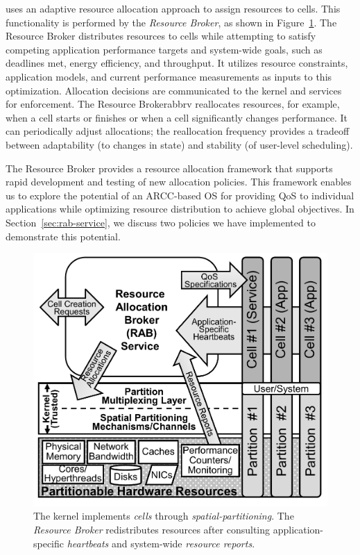 \tess uses an adaptive resource allocation approach to assign resources
to cells.  This functionality is performed by the \emph{Resource Broker}, as
shown in Figure~\ref{fig:tess-arch}.  The Resource Broker distributes
resources to cells while attempting to satisfy competing application
performance targets and system-wide goals, such as deadlines met, energy
efficiency, and throughput.  It utilizes resource constraints,
application models, and current performance measurements as inputs to
this optimization.  Allocation decisions are communicated to the kernel
and services for enforcement.  The Resource Brokerabbrv reallocates resources,
for example, when a cell starts or finishes or when a cell significantly
changes performance.  It can periodically adjust allocations; the
reallocation frequency provides a tradeoff between adaptability (to
changes in state) and stability (of user-level scheduling).

The Resource Broker provides a resource allocation framework that supports
rapid development and testing of new allocation policies.  This
framework enables us to explore the potential of an ARCC-based OS for
providing QoS to individual applications while optimizing resource
distribution to achieve global objectives.  In
Section~\ref{sec:rab-service}, we discuss two policies we have
implemented to demonstrate this potential.


\begin{figure}[t]
\centering
\includegraphics[width=0.885\linewidth]{Figures/NewPolicyFig-Tess}
\caption{
The \tess kernel implements \emph{cells} through \emph{spatial-partitioning}.
The \emph{Resource Broker} redistributes resources after consulting application-specific
\emph{heartbeats} and system-wide \emph{resource reports}.
}
\label{fig:tess-arch}
\end{figure}



